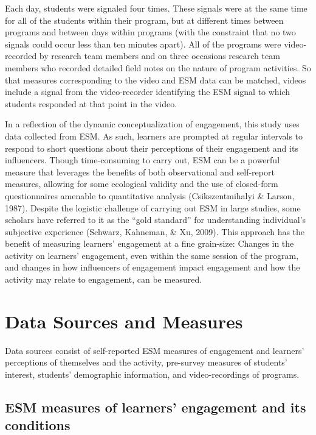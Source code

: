 \documentclass[]{msu-thesis}
\theoremstyle{definition}
\theoremstyle{definition}
\theoremstyle{definition}
\theoremstyle{remark}
\begin{document}
Each day, students were signaled four times. These signals were at the
same time for all of the students within their program, but at different
times between programs and between days within programs (with the
constraint that no two signals could occur less than ten minutes apart).
All of the programs were video-recorded by research team members and on
three occasions research team members who recorded detailed field notes
on the nature of program activities. So that measures corresponding to
the video and ESM data can be matched, videos include a signal from the
video-recorder identifying the ESM signal to which students responded at
that point in the video.

In a reflection of the dynamic conceptualization of engagement, this
study uses data collected from ESM. As such, learners are prompted at
regular intervals to respond to short questions about their perceptions
of their engagement and its influencers. Though time-consuming to carry
out, ESM can be a powerful measure that leverages the benefits of both
observational and self-report measures, allowing for some ecological
validity and the use of closed-form questionnaires amenable to
quantitative analysis (Csikszentmihalyi \& Larson, 1987). Despite the
logistic challenge of carrying out ESM in large studies, some scholars
have referred to it as the ``gold standard'' for understanding
individual's subjective experience (Schwarz, Kahneman, \& Xu, 2009).
This approach has the benefit of measuring learners' engagement at a
fine grain-size: Changes in the activity on learners' engagement, even
within the same session of the program, and changes in how influencers
of engagement impact engagement and how the activity may relate to
engagement, can be measured.

\section{Data Sources and Measures}\label{data-sources-and-measures}

Data sources consist of self-reported ESM measures of engagement and
learners' perceptions of themselves and the activity, pre-survey
measures of students' interest, students' demographic information, and
video-recordings of programs.

\subsection{ESM measures of learners' engagement and its
conditions}\label{esm-measures-of-learners-engagement-and-its-conditions}
\end{document}
